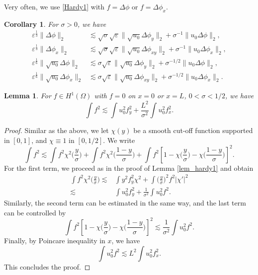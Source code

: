 \documentclass[reqno, 11pt]{amsart}
\theoremstyle{plain}
\newtheorem{lemma}[theorem]{Lemma}
\newtheorem{corollary}[theorem]{Corollary}
\theoremstyle{definition}
\theoremstyle{remark}
\numberwithin{equation}{section}
\begin{document}
Very often, we use \eqref{Hardy1} with $f= \Delta \phi$ or $f = \Delta \phi_x$.

\begin{corollary}
For $\sigma > 0$, we have
\begin{equation}\label{est:L_weighted_Hardy}
\begin{aligned}
\varepsilon^{\frac{1}{3}}\| \Delta \phi\|_2 & \lesssim \sqrt\sigma \sqrt\varepsilon \| \sqrt{u_0} \Delta \phi_y\|_2 + \sigma^{-1} \|u_0 \Delta \phi\|_2,\\
\varepsilon^{\frac{1}{3}}\| \Delta \phi_x\|_2 & \lesssim \sqrt\sigma \sqrt\varepsilon \| \sqrt{u_0} \Delta \phi_{xy}\|_2 + \sigma^{-1} \|u_0 \Delta \phi_x\|_2,\\
\varepsilon^{\frac{1}{6}}\| \sqrt{u_0} \Delta \phi\|_2 & \lesssim \sigma \sqrt\varepsilon \| \sqrt{u_0} \Delta \phi_y\|_2 + \sigma^{-1/2} \|u_0 \Delta \phi\|_2,\\
\varepsilon^{\frac{1}{6}}\| \sqrt{u_0} \Delta \phi_x\|_2 & \lesssim \sigma \sqrt\varepsilon \| \sqrt{u_0} \Delta \phi_{xy}\|_2 + \sigma^{-1/2} \|u_0 \Delta \phi_x\|_2.
\end{aligned}
\end{equation}
\end{corollary}

\begin{lemma}\label{lem_hardy2}
For $f \in H^1(\Omega)$ with $f = 0$ on $x = 0$ or $x = L$, $0 < \sigma < 1/2$, we have
\begin{equation}\label{Hardy2}
\int f^2 \lesssim \int u_0^2 f_{y}^2 + \frac{L^2}{\sigma^2}  \int u_0^2 f_x^2.
\end{equation}
\end{lemma}
\begin{proof}
Similar as the above, we let $\chi(y)$ be a smooth cut-off function supported in $[0,1]$, and $\chi \equiv 1$ in $[0, 1/2]$. We write
$$
\int f^2 \lesssim \int f^2 \chi^2 \Big( \frac{y}{\sigma} \Big) + \int f^2 \chi^2 \Big( \frac{1-y}{\sigma} \Big) + \int f^2 [1-\chi\Big( \frac{y}{\sigma} \Big) - \chi \Big( \frac{1-y}{\sigma} \Big)]^2.
$$
For the first term, we proceed as in the proof of Lemma \ref{lem_hardy1} and obtain
\begin{align*}
\int f^2 \chi^2 \Big( \frac{y}{\sigma} \Big)\lesssim & \int y^2 f_{y}^2 \chi^2 + \int \Big( \frac{y}{\sigma} \Big)^2 f^2 |\chi'|^2\\
\lesssim &  \int u_0^2 f_{y}^2 + \frac{1}{\sigma^2} \int u_0^2 f^2.
\end{align*}
Similarly, the second term can be estimated in the same way, and the last term can be controlled by
$$
\int f^2  [1-\chi\Big( \frac{y}{\sigma} \Big) - \chi \Big( \frac{1-y}{\sigma} \Big)]^2 \lesssim \frac{1}{\sigma^2} \int u_0^2 f^2.
$$
Finally, by Poincare inequality in $x$, we have
$$
\int u_0^2 f^2 \lesssim  L^2 \int u_0^2 f_x^2.
$$
This concludes the proof.
\end{proof}
\end{document}
